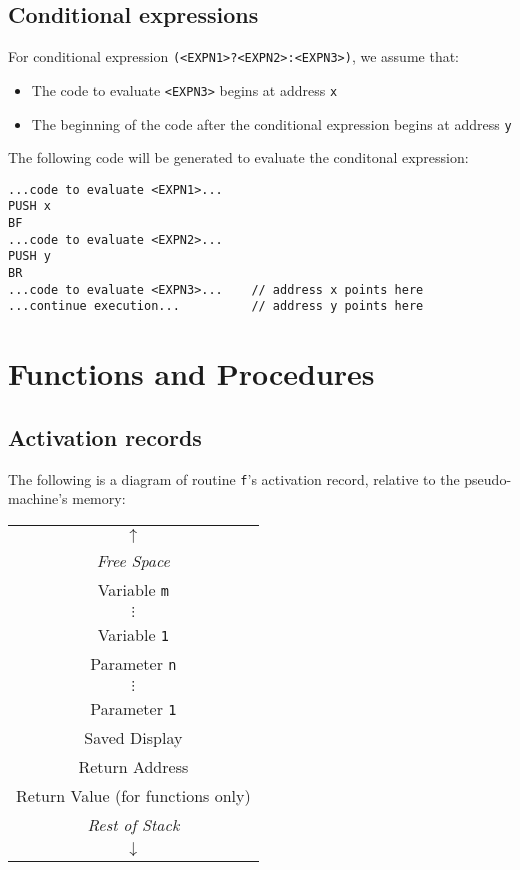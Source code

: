 \documentclass[11pt]{article}
\begin{document}
\subsection{Conditional expressions}

For conditional expression \texttt{(<EXPN1>?<EXPN2>:<EXPN3>)}, we assume that:
\begin{itemize}
    \item The code to evaluate \texttt{<EXPN3>} begins at address \texttt{x}
    \item The beginning of the code after the conditional expression begins at address \texttt{y}
\end{itemize}

The following code will be generated to evaluate the conditonal expression:

\begin{verbatim}
...code to evaluate <EXPN1>...
PUSH x
BF
...code to evaluate <EXPN2>...
PUSH y
BR
...code to evaluate <EXPN3>...    // address x points here
...continue execution...          // address y points here
\end{verbatim}

\section{Functions and Procedures}

\subsection{Activation records}

The following is a diagram of routine \texttt{f}'s activation record, relative
to the pseudo-machine's memory:

    \begin{tabular}{|c|}
    \hline
    \cellcolor{gray!15}
    $\uparrow$\\
    \cellcolor{gray!15}
    \textit{Free Space} \\
    \hline
    Variable \texttt{m}\\
    $\vdots$\\
    Variable \texttt{1}\\
    \hline
    Parameter \texttt{n}\\
    $\vdots$\\
    Parameter \texttt{1}\\
    \hline
    Saved Display \\
    \hline
    Return Address\\
    \hline
    Return Value (for functions only) \\
    \hline
    \cellcolor{gray!15}
    \textit{Rest of Stack} \\
    \cellcolor{gray!15}
    $\downarrow$\\
    \hline
    \end{tabular}
\end{document}
